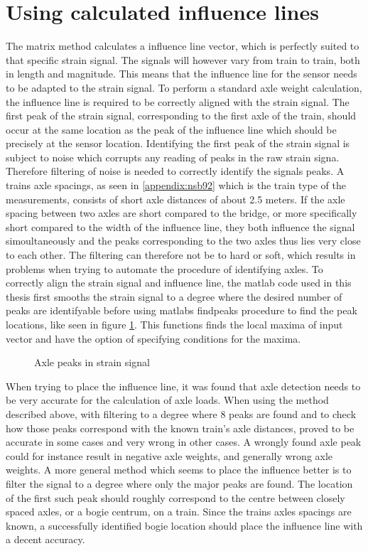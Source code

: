 \section{Using calculated influence lines}
\label{section:using_influence_lines}
The matrix method calculates a influence line vector, which is perfectly suited to that specific strain signal. The signals will however vary from train to train, both in length and magnitude. This means that the influence line for the sensor needs to be adapted to the strain signal.
To perform a standard axle weight calculation, the influence line is required to be correctly aligned with the strain signal.
The first peak of the strain signal, corresponding to the first axle of the train, should occur at the same location as the peak of the influence line which should be precisely at the sensor location.
Identifying the first peak of the strain signal is subject to noise which corrupts any reading of peaks in the raw strain signa. Therefore filtering of noise is needed to correctly identify the signals peaks. A trains axle spacings, as seen in \ref{appendix:nsb92} which is the train type of the measurements, consists of short axle distances of about 2.5 meters. If the axle spacing between two axles are short compared to the bridge, or more specifically short compared to the width of the influence line, they both influence the signal simoultaneously and the peaks corresponding to the two axles thus lies very close to each other. The filtering can therefore not be to hard or soft, which results in problems when trying to automate the procedure of identifying axles.
To correctly align the strain signal and influence line, the matlab code used in this thesis first smooths the strain signal to a degree where the desired number of peaks are identifyable before using matlabs findpeaks \cite{findpeaks} procedure to find the peak locations, like seen in figure \ref{fig:axle_peaks}. This functions finds the local maxima of input vector and have the option of specifying conditions for the maxima.
\begin{figure}[htbp]
	\begin{adjustbox}{center}
		
	\end{adjustbox}
	\caption{Axle peaks in strain signal}
	\label{fig:axle_peaks}
\end{figure}
When trying to place the influence line, it was found that axle detection needs to be very accurate for the calculation of axle loads. When using the method described above, with filtering to a degree where 8 peaks are found and to check how those peaks correspond with the known train's axle distances, proved to be accurate in some cases and very wrong in other cases. A wrongly found axle peak could for instance result in negative axle weights, and generally wrong axle weights. A more general method which seems to place the influence better is to filter the signal to a degree where only the major peaks are found. The location of the first such peak should roughly correspond to the centre between closely spaced axles, or a bogie centrum, on a train. Since the trains axles spacings are known, a successfully identified bogie location should place the influence line with a decent accuracy.

